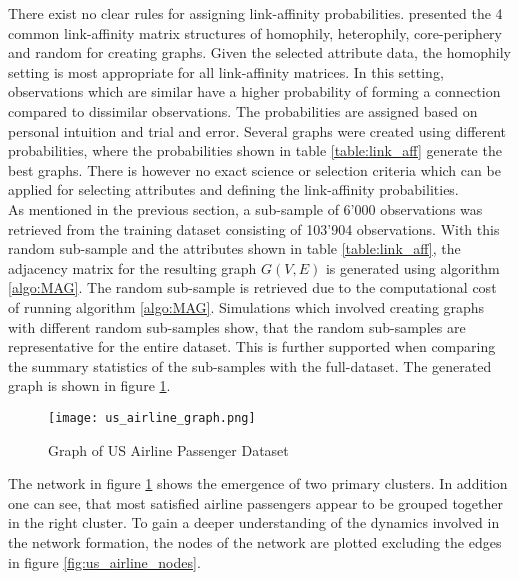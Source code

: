   \noindent There exist no clear rules for assigning link-affinity
  probabilities. \citeauthor{kim2012multiplicative} 
  \citeyearpar[p. 118]{kim2012multiplicative} presented the 4 common 
  link-affinity matrix structures of homophily, heterophily, core-periphery and 
  random for creating graphs. Given the selected attribute data, the homophily 
  setting is most appropriate for all link-affinity matrices. In this setting, 
  observations which are similar have a higher probability of forming a 
  connection compared to dissimilar observations. The probabilities are 
  assigned based on personal intuition and trial and error. Several graphs were 
  created using different probabilities, where the probabilities shown in table 
  \ref{table:link_aff} generate the best graphs. There is however no exact 
  science or selection criteria which can be applied for selecting attributes 
  and defining the link-affinity probabilities. \\

  \noindent As mentioned in the previous section, a sub-sample of 6'000 
  observations was retrieved from the training dataset consisting of 103’904 
  observations. With this random sub-sample and the attributes shown in table
  \ref{table:link_aff}, the adjacency matrix for the 
  resulting graph $G(V,E)$ is generated using algorithm \ref{algo:MAG}. The 
  random sub-sample is retrieved due to the computational cost of running 
  algorithm \ref{algo:MAG}. Simulations which involved creating graphs with 
  different random sub-samples show, that the random sub-samples are 
  representative for the entire dataset. This is further supported when 
  comparing the summary statistics of the sub-samples with the full-dataset. 
  The generated graph is shown in figure \ref{fig:us_airline_graph}.

  \begin{figure}[h]
	  \centering
	  \texttt{[image: us\_airline\_graph.png]}
	  \caption{Graph of US Airline Passenger Dataset}
      \label{fig:us_airline_graph}
  \end{figure}
  
  \noindent The network in figure \ref{fig:us_airline_graph} shows the 
  emergence of two primary clusters. In addition one can see, that most satisfied 
  airline passengers appear to be grouped together in the right cluster. To 
  gain a deeper understanding of the dynamics involved in the network formation, 
  the nodes of the network are plotted excluding the edges in figure
  \ref{fig:us_airline_nodes}.

